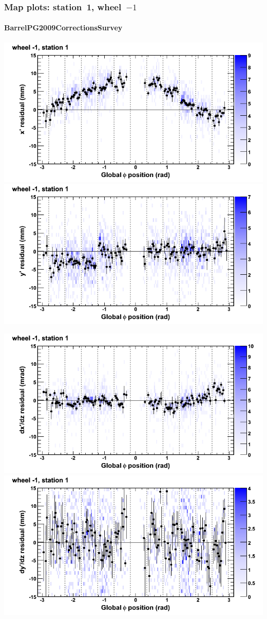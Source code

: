 \documentclass[compress]{beamer}
\begin{document}
\begin{frame}
\frametitle{Map plots: station~1, wheel~$-1$}
\framesubtitle{BarrelPG2009CorrectionsSurvey}
\includegraphics[width=0.5\linewidth]{mapplots_01/DTvsphi_st1whB_x.png}
\includegraphics[width=0.5\linewidth]{mapplots_01/DTvsphi_st1whB_y.png}

\includegraphics[width=0.5\linewidth]{mapplots_01/DTvsphi_st1whB_dxdz.png}
\includegraphics[width=0.5\linewidth]{mapplots_01/DTvsphi_st1whB_dydz.png}
\end{frame}
\end{document}
